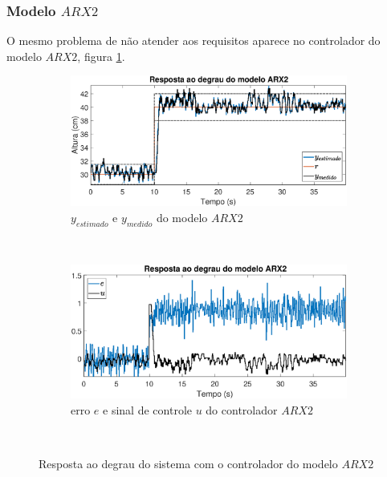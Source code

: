 \subsubsection{Modelo $ARX2$}
O mesmo problema de não atender aos requisitos aparece no controlador do modelo $ARX2$, figura \ref{fig:steprarx2y}.
\begin{figure}[htb]
	\centering
	\begin{subfigure}[t]{0.48\textwidth}
		\includegraphics[width=1\linewidth]{steprarx2y}
		\caption[$y_{estimado}$ e $y_{medido}$ do modelo $ARX2$]{$y_{estimado}$ e $y_{medido}$ do modelo $ARX2$}
		\label{fig:steprarx2y}
	\end{subfigure}
	~ %
	\begin{subfigure}[t]{0.48\textwidth}
		\includegraphics[width=1\linewidth]{steprarx2e}
		\caption[erro $e$ e sinal de controle $u$ do controlador $ARX2$]{erro $e$ e sinal de controle $u$ do controlador $ARX2$}
		\label{fig:steprarx2e}
	\end{subfigure}
	~ %
	
	\caption{Resposta ao degrau do sistema com o controlador do modelo $ARX2$}\label{fig:steprarx2}
\end{figure}

